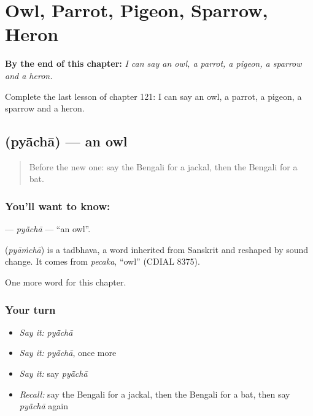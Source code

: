 
\chapter{Owl, Parrot, Pigeon, Sparrow, Heron}
\label{ch:bn-owl-parrot-pigeon-sparrow-heron}

\begin{chapteropening}
\textbf{By the end of this chapter:} \emph{I can say an owl, a parrot, a pigeon, a sparrow and a heron.}

Complete the last lesson of chapter 121: I can say an owl, a parrot, a pigeon, a sparrow and a heron.
\end{chapteropening}

\section[\texorpdfstring{\bn{প্যাঁচা} (pyā̃chā)}{প্যাঁচা (pyā̃chā)}]{ (pyā̃chā) — an owl}

\label{lesson:BN-C121-pyacha}



\begin{quote}
Before the new one: say the Bengali for a jackal, then the Bengali for a bat.
\end{quote}

\subsection*{You'll want to know: }
\textbf{} — \emph{pyā̃chā} — \textquotedblleft{}an owl\textquotedblright{}.

\begin{cousinweb}
\textbf{} (\emph{pyāṁchā}) is a tadbhava, a word inherited from Sanskrit and reshaped by sound change. It comes from \emph{pecaka}, \textquotedblleft{}owl\textquotedblright{} (CDIAL 8375).
\end{cousinweb}

\begin{grammarlens}[title={What you've built}]
One more word for this chapter.
\end{grammarlens}

\subsection*{Your turn}
\begin{itemize}
\raggedright
  \item \emph{Say it:} \emph{pyā̃chā}
  \item \emph{Say it:} \emph{pyā̃chā}, once more
  \item \emph{Say it:} say \emph{pyā̃chā}
  \item \emph{Recall:} say the Bengali for a jackal, then the Bengali for a bat, then say \emph{pyā̃chā} again
\end{itemize}

